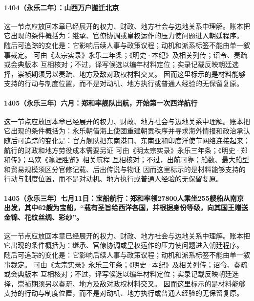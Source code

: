 \paragraph{1404（永乐二年）：山西万户搬迁北京} 这一节点应放回本章已经展开的权力、财政、地方社会与边地关系中理解。账本把它出现的条件概括为：继承、官僚协调或皇权运作的压力使问题进入朝廷程序。 随后可追踪的变化是：它影响后续人事与政策议程；动机和派系标签不能由单一叙事裁定。 可由《太宗实录》永乐二年条；《明史·本纪》及相关列传；诏令、奏疏或会典版本 互相核对；不过，译写候选以编年材料定位；实录记载反映朝廷选择，崇祯期须另以奏疏、地方及敌对政权材料交叉。 因而这里标示的是材料能够支持的行动与制度位置，而不是对动机、地方执行或普通人经验的无保留复原。

\paragraph{1405（永乐三年）六月：郑和率舰队出航，开始第一次西洋航行} 这一节点应放回本章已经展开的权力、财政、地方社会与边地关系中理解。账本把它出现的条件概括为：永乐朝借海上使团重建朝贡秩序并寻求海外情报和政治承认 随后可追踪的变化是：官方舰队把东南港口、东南亚和印度洋使节网络连接起来；航行的财政和地方劳役成本需要另证 可由《明太宗实录》永乐三年条；《明史·郑和传》；马欢《瀛涯胜览》相关航程 互相核对；不过，出航可靠；船数、最大船型和贸易规模须区分官修记载、后出传说与物证 因而这里标示的是材料能够支持的行动与制度位置，而不是对动机、地方执行或普通人经验的无保留复原。

\paragraph{1405（永乐三年）七月11日：宝船航行：郑和率领27800人乘坐255艘船从南京出发，其中62艘为宝船，“载有圣旨给西洋各国，并根据身份等级，向其国王赠送金锦、花纹丝绸、彩纱”。} 这一节点应放回本章已经展开的权力、财政、地方社会与边地关系中理解。账本把它出现的条件概括为：继承、官僚协调或皇权运作的压力使问题进入朝廷程序。 随后可追踪的变化是：它影响后续人事与政策议程；动机和派系标签不能由单一叙事裁定。 可由《太宗实录》永乐三年条；《明史·本纪》及相关列传；诏令、奏疏或会典版本 互相核对；不过，译写候选以编年材料定位；实录记载反映朝廷选择，崇祯期须另以奏疏、地方及敌对政权材料交叉。 因而这里标示的是材料能够支持的行动与制度位置，而不是对动机、地方执行或普通人经验的无保留复原。

